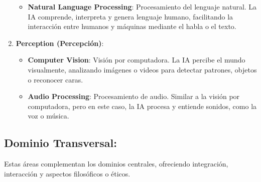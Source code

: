 \documentclass[
  10pt,
  letterpaper,
]{book}
\providecommand{\tightlist}{%
  \setlength{\itemsep}{0pt}\setlength{\parskip}{0pt}}\usepackage{longtable,booktabs,array}
\begin{document}
\begin{enumerate}
  \begin{itemize}
  \tightlist
  \item
    \textbf{Natural Language Processing}: Procesamiento del lenguaje
    natural. La IA comprende, interpreta y genera lenguaje humano,
    facilitando la interacción entre humanos y máquinas mediante el
    habla o el texto.
  \end{itemize}
\item
  \textbf{Perception (Percepción)}:

  \begin{itemize}
  \tightlist
  \item
    \textbf{Computer Vision}: Visión por computadora. La IA percibe el
    mundo visualmente, analizando imágenes o videos para detectar
    patrones, objetos o reconocer caras.
  \item
    \textbf{Audio Processing}: Procesamiento de audio. Similar a la
    visión por computadora, pero en este caso, la IA procesa y entiende
    sonidos, como la voz o música.
  \end{itemize}
\end{enumerate}

\subsection{Dominio Transversal:}\label{dominio-transversal}

Estas áreas complementan los dominios centrales, ofreciendo integración,
interacción y aspectos filosóficos o éticos.
\end{document}
